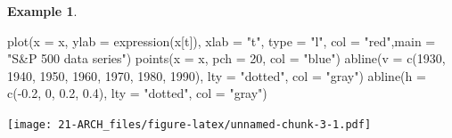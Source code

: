 \documentclass[
]{book}
\newenvironment{Shaded}{\begin{snugshade}}{\end{snugshade}}
\newcommand{\AttributeTok}[1]{\textcolor[rgb]{0.77,0.63,0.00}{#1}}
\newcommand{\DecValTok}[1]{\textcolor[rgb]{0.00,0.00,0.81}{#1}}
\newcommand{\FloatTok}[1]{\textcolor[rgb]{0.00,0.00,0.81}{#1}}
\newcommand{\FunctionTok}[1]{\textcolor[rgb]{0.00,0.00,0.00}{#1}}
\newcommand{\NormalTok}[1]{#1}
\newcommand{\SpecialCharTok}[1]{\textcolor[rgb]{0.00,0.00,0.00}{#1}}
\newcommand{\StringTok}[1]{\textcolor[rgb]{0.31,0.60,0.02}{#1}}
\theoremstyle{definition}
\theoremstyle{definition}
\newtheorem{example}{Example}[chapter]
\theoremstyle{definition}
\theoremstyle{definition}
\theoremstyle{remark}
\begin{document}
\begin{example}
\begin{Shaded}
\begin{Highlighting}[]
\FunctionTok{plot}\NormalTok{(}\AttributeTok{x =}\NormalTok{ x, }\AttributeTok{ylab =} \FunctionTok{expression}\NormalTok{(x[t]), }\AttributeTok{xlab =} \StringTok{"t"}\NormalTok{, }\AttributeTok{type =} 
       \StringTok{"l"}\NormalTok{, }\AttributeTok{col =} \StringTok{"red"}\NormalTok{,}\AttributeTok{main =} \StringTok{"S\&P 500 data series"}\NormalTok{)}
\FunctionTok{points}\NormalTok{(}\AttributeTok{x =}\NormalTok{ x, }\AttributeTok{pch =} \DecValTok{20}\NormalTok{, }\AttributeTok{col =} \StringTok{"blue"}\NormalTok{)}
\FunctionTok{abline}\NormalTok{(}\AttributeTok{v =} \FunctionTok{c}\NormalTok{(}\DecValTok{1930}\NormalTok{, }\DecValTok{1940}\NormalTok{, }\DecValTok{1950}\NormalTok{, }\DecValTok{1960}\NormalTok{, }\DecValTok{1970}\NormalTok{, }\DecValTok{1980}\NormalTok{, }\DecValTok{1990}\NormalTok{), }
         \AttributeTok{lty =} \StringTok{"dotted"}\NormalTok{, }\AttributeTok{col =} \StringTok{"gray"}\NormalTok{) }
\FunctionTok{abline}\NormalTok{(}\AttributeTok{h =} \FunctionTok{c}\NormalTok{(}\SpecialCharTok{{-}}\FloatTok{0.2}\NormalTok{, }\DecValTok{0}\NormalTok{, }\FloatTok{0.2}\NormalTok{, }\FloatTok{0.4}\NormalTok{), }\AttributeTok{lty =} \StringTok{"dotted"}\NormalTok{, }\AttributeTok{col =} 
         \StringTok{"gray"}\NormalTok{) }
\end{Highlighting}
\end{Shaded}

\texttt{[image: 21-ARCH\_files/figure-latex/unnamed-chunk-3-1.pdf]}
\end{example}
\end{document}
